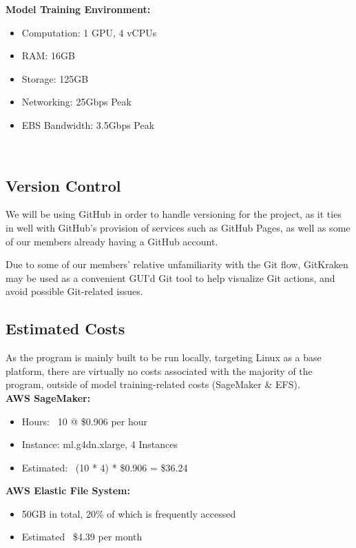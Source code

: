 \documentclass[conference]{IEEEtran}
\begin{document}
\textbf{Model Training Environment:}
\begin{itemize}
\item Computation: 1 GPU, 4 vCPUs
\item RAM: 16GB
\item Storage: 125GB
\item Networking: 25Gbps Peak
\item EBS Bandwidth: 3.5Gbps Peak
\end{itemize}~\\

\subsection{Version Control}
We will be using GitHub in order to handle versioning for the project, as it ties in well with GitHub's provision of services such as GitHub Pages, as well as some of our members already having a GitHub account.

Due to some of our members' relative unfamiliarity with the Git flow, GitKraken may be used as a convenient GUI'd Git tool to help visualize Git actions, and avoid possible Git-related issues.
\newline

\subsection{Estimated Costs}
As the program is mainly built to be run locally, targeting Linux as a base platform, there are virtually no costs associated with the majority of the program, outside of model training-related costs (SageMaker \& EFS).~\\

\textbf{AWS SageMaker:}
\begin{itemize}
\item Hours: ~10 @ \$0.906 per hour
\item Instance: ml.g4dn.xlarge, 4 Instances
\item Estimated: ~(10 * 4) * \$0.906 = \$36.24
\end{itemize}

\textbf{AWS Elastic File System:}
\begin{itemize}
\item 50GB in total, 20\% of which is frequently accessed
\item Estimated ~\$4.39 per month
\end{itemize}~\\
\end{document}
